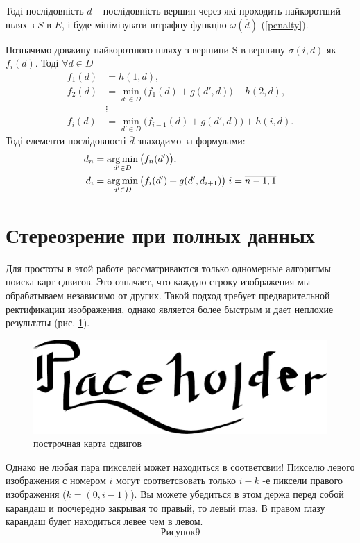 Тоді послідовність $\overline{d}$ -- послідовність вершин через які проходить найкоротший шлях з $S$ в $E$, і буде мінімізувати штрафну функцію $ \omega(\overline{d}) $ (\ref{penalty}).

Позначимо довжину найкоротшого шляху з вершини S в вершину $ \sigma(i, d) $ як $ f_i (d) $. Тоді $ \forall d \in D $ 
\begin{align*}
f_1 (d) &= h(1, d), \\
f_2 (d) &=  \min\limits_{d' \in D}\Big( f_1(d) + g(d', d) \Big) + h(2, d), \\
&\vdots \\
f_i (d) &= \min\limits_{d' \in D}\Big( f_{i-1}(d) + g(d', d) \Big) + h(i, d).
\end{align*}
Тоді елементи послідовності $\overline{d}$ знаходимо за формулами:
\begin{align*}
d_n &= \operatorname*{arg\,min}\limits_{d' \in D}{\big( f_n(d') \big)}, \\
d_i &= \operatorname*{arg\,min}\limits_{d' \in D}{\big( f_{i}(d') + g(d',d_{i+1})\big) \; i = \overline{n-1, 1}}
\end{align*}	

\section{Стереозрение при полных данных}
Для простоты в этой работе рассматриваются только одномерные алгоритмы поиска карт сдвигов. Это означает, что каждую строку изображения мы обрабатываем независимо от других. Такой подход требует предварительной ректификации изображения, однако является более быстрым и дает неплохие результаты (рис. \ref{results}).
\begin{figure}
	\centering
	\includegraphics[scale = 0.75]{placeholder}
	\caption{построчная карта сдвигов}
	\label{results}
\end{figure}
	
	Однако не любая пара пикселей может находиться в соответсвии! Пикселю левого изображения с номером $i$ могут соответсвовать только $i-k$ -е  пиксели правого изображения ($k = (0,i-1)$). Вы можете убедиться в этом держа перед собой карандаш и поочередно закрывая то правый, то левый глаз. В правом глазу карандаш будет находиться левее чем в левом.
	$$Рисунок 9$$
	

